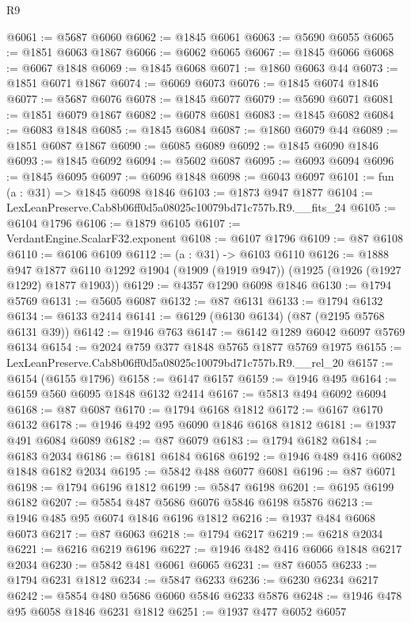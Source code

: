 \begin{lexlean}{R9}
\begin{coremodule}
@6061 := @5687 @6060
@6062 := @1845 @6061
@6063 := @5690 @6055
@6065 := @1851 @6063 @1867
@6066 := @6062 @6065
@6067 := @1845 @6066
@6068 := @6067 @1848
@6069 := @1845 @6068
@6071 := @1860 @6063 @44
@6073 := @1851 @6071 @1867
@6074 := @6069 @6073
@6076 := @1845 @6074 @1846
@6077 := @5687 @6076
@6078 := @1845 @6077
@6079 := @5690 @6071
@6081 := @1851 @6079 @1867
@6082 := @6078 @6081
@6083 := @1845 @6082
@6084 := @6083 @1848
@6085 := @1845 @6084
@6087 := @1860 @6079 @44
@6089 := @1851 @6087 @1867
@6090 := @6085 @6089
@6092 := @1845 @6090 @1846
@6093 := @1845 @6092
@6094 := @5602 @6087
@6095 := @6093 @6094
@6096 := @1845 @6095
@6097 := @6096 @1848
@6098 := @6043 @6097
@6101 := fun (a : @31) => @1845 @6098 @1846
@6103 := @1873 @947 @1877
@6104 := LexLeanPreserve.Cab8b06ff0d5a08025c10079bd71c757b.R9.__fits_24
@6105 := @6104 @1796
@6106 := @1879 @6105
@6107 := VerdantEngine.ScalarF32.exponent
@6108 := @6107 @1796
@6109 := @87 @6108
@6110 := @6106 @6109
@6112 := (a : @31) -> @6103 @6110
@6126 := @1888
    @947
    @1877
    @6110
    @1292
    @1904
    (@1909 (@1919 @947))
    (@1925 (@1926 (@1927 @1292) @1877 @1903))
@6129 := @4357 @1290 @6098 @1846
@6130 := @1794 @5769
@6131 := @5605 @6087
@6132 := @87 @6131
@6133 := @1794 @6132
@6134 := @6133 @2414
@6141 := @6129 (@6130 @6134) (@87 (@2195 @5768 @6131 @39))
@6142 := @1946 @763
@6147 := @6142 @1289 @6042 @6097 @5769 @6134
@6154 := @2024 @759 @377 @1848 @5765 @1877 @5769 @1975
@6155 := LexLeanPreserve.Cab8b06ff0d5a08025c10079bd71c757b.R9.__rel_20
@6157 := @6154 (@6155 @1796)
@6158 := @6147 @6157
@6159 := @1946 @495
@6164 := @6159 @560 @6095 @1848 @6132 @2414
@6167 := @5813 @494 @6092 @6094
@6168 := @87 @6087
@6170 := @1794 @6168 @1812
@6172 := @6167 @6170 @6132
@6178 := @1946 @492 @95 @6090 @1846 @6168 @1812
@6181 := @1937 @491 @6084 @6089
@6182 := @87 @6079
@6183 := @1794 @6182
@6184 := @6183 @2034
@6186 := @6181 @6184 @6168
@6192 := @1946 @489 @416 @6082 @1848 @6182 @2034
@6195 := @5842 @488 @6077 @6081
@6196 := @87 @6071
@6198 := @1794 @6196 @1812
@6199 := @5847 @6198
@6201 := @6195 @6199 @6182
@6207 := @5854 @487 @5686 @6076 @5846 @6198 @5876
@6213 := @1946 @485 @95 @6074 @1846 @6196 @1812
@6216 := @1937 @484 @6068 @6073
@6217 := @87 @6063
@6218 := @1794 @6217
@6219 := @6218 @2034
@6221 := @6216 @6219 @6196
@6227 := @1946 @482 @416 @6066 @1848 @6217 @2034
@6230 := @5842 @481 @6061 @6065
@6231 := @87 @6055
@6233 := @1794 @6231 @1812
@6234 := @5847 @6233
@6236 := @6230 @6234 @6217
@6242 := @5854 @480 @5686 @6060 @5846 @6233 @5876
@6248 := @1946 @478 @95 @6058 @1846 @6231 @1812
@6251 := @1937 @477 @6052 @6057

\end{coremodule}
\end{lexlean}
